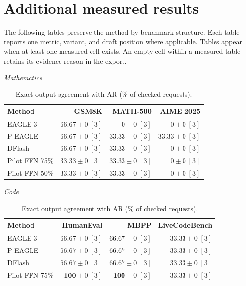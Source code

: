 \documentclass[conference,onecolumn]{IEEEtran}
\begin{document}
\section{Additional measured results}
The following tables preserve the method-by-benchmark structure. Each table reports one metric, variant, and draft position where applicable. Tables appear when at least one measured cell exists. An empty cell within a measured table retains its evidence reason in the export.
\begin{table}[!htp]
\centering\small
\setlength{\tabcolsep}{3pt}
\caption{Exact output agreement with AR (\% of checked requests).}
\label{tab:appendix-metric-quality-none}
\textit{Mathematics}\par\smallskip
\begin{tabular}{@{}>{\raggedright\arraybackslash}p{3.7cm}rrr@{}}
\toprule
Method & GSM8K & MATH-500 & AIME 2025 \\
\midrule
EAGLE-3 & \(\mathbf{66.67} \pm 0\;[3]\) & \(0 \pm 0\;[3]\) & \(0 \pm 0\;[3]\) \\
P-EAGLE & \(\mathbf{66.67} \pm 0\;[3]\) & \(\mathbf{33.33} \pm 0\;[3]\) & \(\mathbf{33.33} \pm 0\;[3]\) \\
DFlash & \(\mathbf{66.67} \pm 0\;[3]\) & \(\mathbf{33.33} \pm 0\;[3]\) & \(0 \pm 0\;[3]\) \\
Pilot FFN 75\% & \(33.33 \pm 0\;[3]\) & \(\mathbf{33.33} \pm 0\;[3]\) & \(0 \pm 0\;[3]\) \\
Pilot FFN 50\% & \(33.33 \pm 0\;[3]\) & \(\mathbf{33.33} \pm 0\;[3]\) & \(0 \pm 0\;[3]\) \\
\bottomrule
\end{tabular}\par\medskip
\textit{Code}\par\smallskip
\begin{tabular}{@{}>{\raggedright\arraybackslash}p{3.7cm}rrr@{}}
\toprule
Method & HumanEval & MBPP & LiveCodeBench \\
\midrule
EAGLE-3 & \(66.67 \pm 0\;[3]\) & \(66.67 \pm 0\;[3]\) & \(\mathbf{33.33} \pm 0\;[3]\) \\
P-EAGLE & \(66.67 \pm 0\;[3]\) & \(66.67 \pm 0\;[3]\) & \(\mathbf{33.33} \pm 0\;[3]\) \\
DFlash & \(66.67 \pm 0\;[3]\) & \(66.67 \pm 0\;[3]\) & \(\mathbf{33.33} \pm 0\;[3]\) \\
Pilot FFN 75\% & \(\mathbf{100} \pm 0\;[3]\) & \(\mathbf{100} \pm 0\;[3]\) & \(\mathbf{33.33} \pm 0\;[3]\) \\

\end{tabular}
\end{table}
\end{document}
